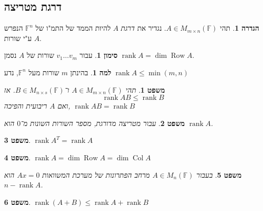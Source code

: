 \documentclass[]{article}
\DeclareMathOperator{\row}    {Row}
\DeclareMathOperator{\rk}     {rank}
\DeclareMathOperator{\col}    {Col}
\newcommand\F         {\mathbb{F}}
\newcommand\mat[2]    {M_{#1\times#2}}
\newcommand\gmat      {\mat{m}{n}(\F)}
\newtheorem{Theorem}{משפט}
\theoremstyle{definition}
\newtheorem{definition}{הגדרה}
\newtheorem{Lemma}{למה}
\newtheorem{Notion}{סימון}
\newcommand\theo  [1] {\begin{Theorem}#1\end{Theorem}}
\newcommand\defi  [1] {\begin{definition}#1\end{definition}}
\newcommand\lem   [1] {\begin{Lemma}#1\end{Lemma}}
\newcommand\noti  [1] {\begin{Notion}#1\end{Notion}}
\begin{document}
\begin{multicols}{2}
		\section{דרגת מטריצה}
		\defi{תהי $A \in M_{m \times n}(\F)$. נגדיר את \textit{דרגת} $A$ להיות הממד של התמ"ו של $\F^n$ הנפרש ע"י שורות $A$. }
		\noti{עבור $v_1 \dots v_m$ שורות של $A$ נסמן $\rk A = \dim \row A$. }
		\lem{בהינתן $m$ שורות מעל $\F^n$, נדע $\rk A \le \min(m, n)$}
		\theo{תהי $A \in \gmat$ ו־$B \in \mat{n}{s}(\F)$. אז \[ \rk AB \le \rk B \] ואם $A$ ריבועית והפיכה, $\rk AB = \rk B$}
		\theo{עבור מטריצה מדורגת, מספר השורות השונות מ־$0$ הוא $\rk A$. }
		\theo{\hfil $\rk A^T = \rk A$}
		\theo{\hfil $\rk A = \dim \row A = \dim \col A$}
		\theo{בעבור $A \in M_n(\F)$ מרחב הפתרונות של מערכת המשוואות $Ax = 0$ הוא $n - \rk A$. }
		\theo{\hfil $\rk (A + B) \le \rk A + \rk B$}
		

\end{multicols}
\end{document}
